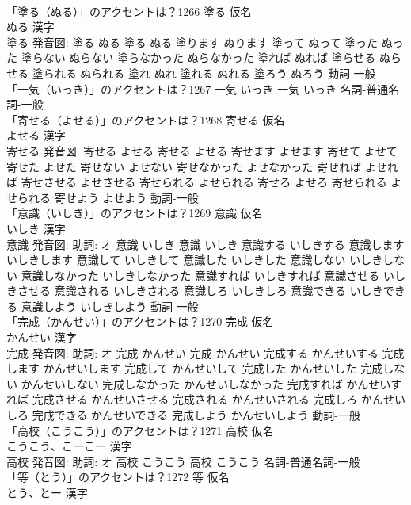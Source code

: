 \documentclass[8pt]{extreport}
\begin{document}
\begin{CJK}{UTF8}{min}
\\	「塗る（ぬる）」のアクセントは？1266	塗る 仮名　
\\	ぬる 漢字　
\\	塗る 発音図:	塗る ぬる		塗る ぬる 塗ります ぬります 塗って ぬって 塗った ぬった 塗らない ぬらない 塗らなかった ぬらなかった 塗れば ぬれば 塗らせる ぬらせる 塗られる ぬられる 塗れ ぬれ 塗れる ぬれる 塗ろう ぬろう				動詞-一般 
\\	「一気（いっき）」のアクセントは？1267		一気 いっき		一気 いっき				名詞-普通名詞-一般 
\\	「寄せる（よせる）」のアクセントは？1268	寄せる 仮名　
\\	よせる 漢字　
\\	寄せる 発音図:	寄せる よせる		寄せる よせる 寄せます よせます 寄せて よせて 寄せた よせた 寄せない よせない 寄せなかった よせなかった 寄せれば よせれば 寄せさせる よせさせる 寄せられる よせられる 寄せろ よせろ 寄せられる よせられる 寄せよう よせよう				動詞-一般 
\\	「意識（いしき）」のアクセントは？1269	意識 仮名　
\\	いしき 漢字　
\\	意識 発音図: 助詞: オ	意識 いしき		意識 いしき 意識する いしきする 意識します いしきします 意識して いしきして 意識した いしきした 意識しない いしきしない 意識しなかった いしきしなかった 意識すれば いしきすれば 意識させる いしきさせる 意識される いしきされる 意識しろ いしきしろ 意識できる いしきできる 意識しよう いしきしよう				動詞-一般 
\\	「完成（かんせい）」のアクセントは？1270	完成 仮名　
\\	かんせい 漢字　
\\	完成 発音図: 助詞: オ	完成 かんせい		完成 かんせい 完成する かんせいする 完成します かんせいします 完成して かんせいして 完成した かんせいした 完成しない かんせいしない 完成しなかった かんせいしなかった 完成すれば かんせいすれば 完成させる かんせいさせる 完成される かんせいされる 完成しろ かんせいしろ 完成できる かんせいできる 完成しよう かんせいしよう				動詞-一般 
\\	「高校（こうこう）」のアクセントは？1271	高校 仮名　
\\	こうこう、こーこー 漢字　
\\	高校 発音図: 助詞: オ	高校 こうこう		高校 こうこう				名詞-普通名詞-一般 
\\	「等（とう）」のアクセントは？1272	等 仮名　
\\	とう、とー 漢字　

\end{CJK}
\end{document}

